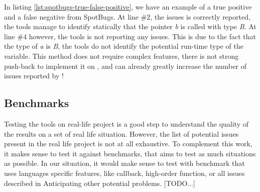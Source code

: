 \begin{enumerate}
	
	
	In listing \ref{lst:spotbugs-true-false-positive}, we have an example of a true positive and a false negative from SpotBugs. At line $\#2$, the issues is correctly reported, the tools manage to identify statically that the pointer \emph{b} is called with type \emph{B}. At line $\#4$ however, the tools is not reporting any issues. This is due to the fact that the type of \emph{a} is \emph{B}, the tools do not identify the potential run-time type of the variable.\newline
	This method does not require complex features, there is not strong push-back to implement it on \slang{}, and can already greatly increase the number of issues reported by \slang{}!
\end{enumerate}

\subsection{Benchmarks}
\label{subsec:benchmarks}

Testing the tools on real-life project is a good step to understand the quality of the results on a set of real life situation. 
However, the list of potential issues present in the real life project is not at all exhaustive. To complement this work, it makes sense to test it against benchmarks, that aims to test as much situations as possible. 
In our situation, it would make sense to test with benchmark that uses languages specific features, like callback, high-order function, or all issues described in Anticipating other potential problems. [TODO...]




